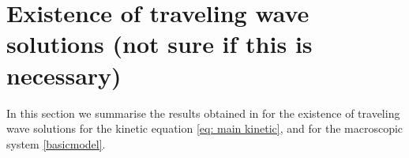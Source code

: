 \documentclass[11pt,twoside]{article}
\numberwithin{equation}{section}
\theoremstyle{plain}
\theoremstyle{nonumberplain}
\begin{document}
{%


\iffalse
\section{Existence of traveling wave solutions (not sure if this is necessary)}

In this section we summarise the results obtained in \cite{calvez2019chemotactic} for the existence of traveling wave solutions for the kinetic equation \eqref{eq: main kinetic},  and for the macroscopic system \eqref{basicmodel}.

}
\end{document}
